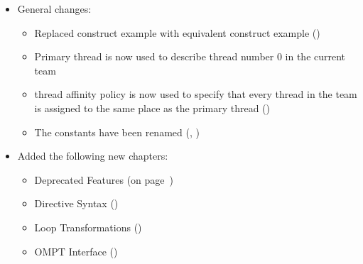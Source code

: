 \begin{itemize}
\item General changes:
\begin{itemize}
  \item Replaced  construct example with equivalent  construct example ()
  \item Primary thread is now used to describe thread number 0 in the current team
  \item {} thread affinity policy is now used to specify that every 
      thread in the team is assigned to the same place as the primary thread ()
  \item The  constants have been renamed  (, )
\end{itemize}

\item Added the following new chapters:
\begin{itemize}
  \item Deprecated Features (on page~\pageref{chap:deprecated_features})
  \item Directive Syntax ()
  \item Loop Transformations ()
  \item OMPT Interface ()
\end{itemize}


\end{itemize}
